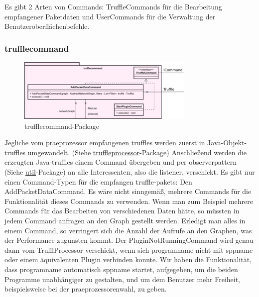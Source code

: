 Es gibt 2 Arten von Commands: TruffleCommands für die Bearbeitung empfangener
Paketdaten und UserCommands für die Verwaltung der Benutzeroberflächenbefehle.

      \subsubsection{trufflecommand}
      \label{subsubsec:trufflecommand}

      \begin{figure}[H]
        \centering
        \includegraphics[width=\textwidth]{../diagramimages/trufflecommand.png}
        \caption{trufflecommand-Package}
      \end{figure}

      \medskip
      Jegliche vom \gls{praeprozessor} empfangenen \glspl{truffle} werden zuerst in Java-Objekt-\glspl{truffle} umgewandelt. (Siehe
      \hyperref[subsubsec:truffleprocessor]{truffleprocessor}-Package) Anschließend
      werden die erzeugten Java-\glspl{truffle} einem Command übergeben und per \gls{observerpattern}
      (Siehe \hyperref[subsec:util]{util}-Package) an alle Interessenten, also die \gls{listener}, verschickt.
      \newline
      \newline
      Es gibt nur einen Command-Typen für die empfangen \gls{truffle}-\glspl{paket}: Den
      AddPacketDataCommand. Es wäre nicht sinngemäß, mehrere Commands für die Funktionalität
      dieses Commands zu verwenden. Wenn man zum Beispiel mehrere Commands für das Bearbeiten von
      verschiedenen Daten hätte, so müssten in jedem Command anfragen an den Graph gestellt werden.
      Erledigt man alles in einem Command, so verringert sich die Anzahl der Aufrufe an den Graphen,
      was der Performance zugunsten kommt.
      \newline
      \newline
      Der PluginNotRunningCommand wird genau dann vom TrufflProcessor verschickt, wenn sich \gls{programname}
      nicht mit \gls{sppname} oder einem äquivalenten Plugin verbinden konnte. Wir
      haben die Funktionalität, dass \gls{programname} automatisch \gls{sppname} startet,
      aufgegeben, um die beiden Programme unabhängiger zu gestalten, und um dem Benutzer
      mehr Freiheit, beispielsweise bei der \gls{praeprozessor}enwahl, zu geben.

